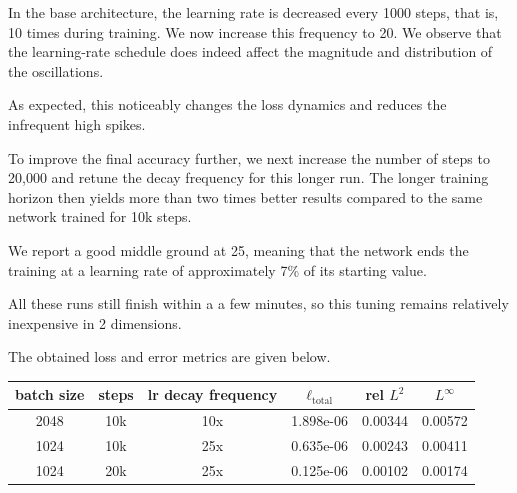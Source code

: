 In the base architecture, the learning rate is decreased every 1000 steps, that is, 10 times during training.
We now increase this frequency to 20. We observe that the learning-rate schedule does indeed affect
the magnitude and distribution of the oscillations.

As expected, this noticeably changes the loss dynamics and reduces the infrequent high spikes.

To improve the final accuracy further, we next
increase the number of steps to 20,000 and retune the decay frequency for this longer run.
The longer training horizon then yields more than two times better results compared to the same network trained for 10k steps.

We report a good middle ground at 25, meaning that the network ends the training
at a learning rate of approximately 7\% of its starting value.


All these runs still finish within a a few minutes, so this tuning remains relatively inexpensive in 2 dimensions.

The obtained loss and error metrics are given below.

\begin{center}
\begin{tabular}{ |c|c|c|c|c|c| } 
\hline
batch size & steps & lr decay frequency & $\ell_{\mathrm{total}}$ & rel $L^2$ & $L^\infty$ \\
\hline
2048 & 10k & 10x & 1.898e-06 & 0.00344 & 0.00572 \\
\hline
1024 & 10k & 25x & 0.635e-06 & 0.00243 & 0.00411 \\
\hline
1024 & 20k & 25x & 0.125e-06 & 0.00102 & 0.00174 \\
\hline
\end{tabular}
\end{center}






